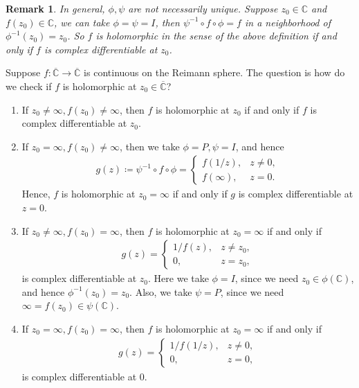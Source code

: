 \documentclass[11pt]{book}
\newtheorem{remark}{Remark}[chapter]
\theoremstyle{definition}
\numberwithin{equation}{chapter}
\begin{document}
\begin{remark}
In general, $\phi, \psi$ are not necessarily unique. Suppose $z_0 \in \mathbb{C}$ and $f(z_0) \in \mathbb{C}$, we can take $\phi = \psi  = I$, then $\psi^{-1} \circ f \circ \phi = f$ in a neighborhood of $\phi^{-1}(z_0) = z_0$. So $f$ is holomorphic in the sense of the above definition if and only if $f$ is complex differentiable at $z_0$.
\end{remark}

\medskip

Suppose $f: \overline{\mathbb{C}} \to \overline{\mathbb{C}}$ is continuous on the Reimann sphere. The question is how do we check if $f$ is holomorphic at $z_0 \in \overline{\mathbb{C}}$?
\begin{enumerate}[label=(\alph*)]
    \item If $z_0 \neq \infty, f(z_0) \neq \infty$, then $f$ is holomorphic at $z_0$ if and only if $f$ is complex differentiable at $z_0$. \label{holo_a}
    
    \item If $z_0 = \infty, f(z_0) \neq \infty$, then we take $\phi = P, \psi = I$, and hence
    \begin{align*}
        g(z) \coloneqq \psi^{-1} \circ f \circ \phi = \begin{cases}
            f(1/z), & z \neq 0, \\
            f(\infty), & z = 0.
        \end{cases}
    \end{align*}
    Hence, $f$ is holomorphic at $z_0 = \infty$ if and only if $g$ is complex differentiable at $z = 0$. \label{holo_b}
    
    \item If $z_0 \neq \infty, f(z_0) = \infty$, then $f$ is holomorphic at $z_0 = \infty$ if and only if
    \begin{align*}
        g(z) = \begin{cases}
            1/f(z), & z \neq z_0, \\
            0, & z = z_0,
        \end{cases}
    \end{align*}
    is complex differentiable at $z_0$. Here we take $\phi = I$, since we need $z_0 \in \phi(\mathbb{C})$, and hence $\phi^{-1}(z_0) = z_0$. Also, we take $\psi = P$, since we need $\infty = f(z_0) \in \psi(\mathbb{C})$. \label{holo_c}
    
    \item If $z_0 = \infty, f(z_0) = \infty$, then $f$ is holomorphic at $z_0 = \infty$ if and only if
    \begin{align*}
        g(z) = \begin{cases}
            1/f(1/z), & z \neq 0, \\
            0, & z = 0,
        \end{cases}
    \end{align*}
    is complex differentiable at $0$. \label{holo_d}
\end{enumerate}
\end{document}
